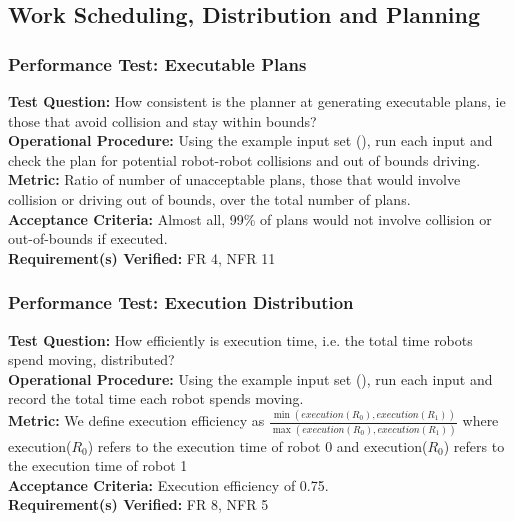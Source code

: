 
\subsection{Work Scheduling, Distribution and Planning}
\label{sec:verification_sdp}

\subsubsection{Performance Test: Executable Plans}
\label{test:sdp_pt_executable}
\textbf{Test Question:} How consistent is the planner at generating executable plans, ie those that avoid collision and stay within bounds? \\
\textbf{Operational Procedure:} Using the example input set (), run each input and check the plan for potential robot-robot collisions and out of bounds driving. \\
\textbf{Metric:} Ratio of number of unacceptable plans, those that would involve collision or driving out of bounds, over the total number of plans. \\
\textbf{Acceptance Criteria:} Almost all, 99\% of plans would not involve collision or out-of-bounds if executed. \\
\textbf{Requirement(s) Verified:} FR 4, NFR 11

\subsubsection{Performance Test: Execution Distribution}
\label{test:sdp_pt_execu}
\textbf{Test Question:} How efficiently is execution time, i.e. the total time robots spend moving, distributed?\\
\textbf{Operational Procedure:} Using the example input set (), run each input and record the total time each robot spends moving. \\
\textbf{Metric:} We define execution efficiency as $\frac{\min(execution(R_{0}), execution(R_{1}))}{\max(execution(R_{0}), execution(R_{1}))}$ where execution($R_{0}$) refers to the execution time of robot 0 and execution($R_{0}$) refers to the execution time of robot 1\\
\textbf{Acceptance Criteria:} Execution efficiency of 0.75.\\
\textbf{Requirement(s) Verified:} FR 8, NFR 5

